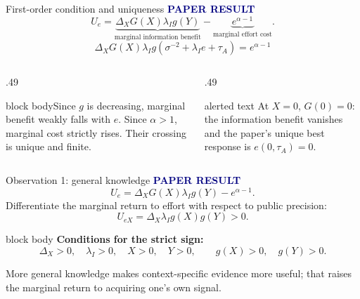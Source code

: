 \documentclass[aspectratio=169,10pt]{beamer}
\newcommand{\paperlabel}{\textcolor{Navy}{\scriptsize\bfseries PAPER RESULT}}
\newcommand{\softbox}[1]{\begin{beamercolorbox}[rounded=true,sep=.6em]{block body}#1\end{beamercolorbox}}
\begin{document}
\begin{frame}{First-order condition and uniqueness}
  \paperlabel
  \vspace{.12cm}
  \[
  U_e=\underbrace{\Delta_XG(X)\lambda_Ig(Y)}_{\text{marginal information benefit}}
       -\underbrace{e^{\alpha-1}}_{\text{marginal effort cost}}.
  \]
  \[
    \boxed{\Delta_XG(X)\lambda_Ig(\sigma^{-2}+\lambda_Ie+\tau_A)
    =e^{\alpha-1}}
  \]

  \vspace{.2cm}
  \begin{columns}[T,onlytextwidth]
    \begin{column}{.49\textwidth}
      \softbox{\small Since $g$ is decreasing, marginal benefit weakly falls
      with $e$. Since $\alpha>1$, marginal cost strictly rises. Their crossing is
      unique and finite.}
    \end{column}
    \begin{column}{.49\textwidth}
      \begin{beamercolorbox}[rounded=true,sep=.6em]{alerted text}
      \small At $X=0$, $G(0)=0$: the information benefit vanishes and the paper's
      unique best response is $e(0,\tau_A)=0$.
      \end{beamercolorbox}
    \end{column}
  \end{columns}
\end{frame}

\begin{frame}{Observation 1: general knowledge}
  \paperlabel
  \vspace{.15cm}
  \[
  U_e=\Delta_XG(X)\lambda_Ig(Y)-e^{\alpha-1}.
  \]
  Differentiate the marginal return to effort with respect to public precision:
  \[
    \boxed{U_{eX}=\Delta_X\lambda_Ig(X)g(Y)>0.}
  \]

  \vspace{.25cm}
  \begin{beamercolorbox}[rounded=true,sep=.75em]{block body}
    \textbf{Conditions for the strict sign:}
    \[
      \Delta_X>0,\quad\lambda_I>0,\quad X>0,\quad Y>0,
      \qquad g(X)>0,\quad g(Y)>0.
    \]
  \end{beamercolorbox}

  \vspace{.25cm}
  \small More general knowledge makes context-specific evidence more useful;
  that raises the marginal return to acquiring one's own signal.
\end{frame}
\end{document}
